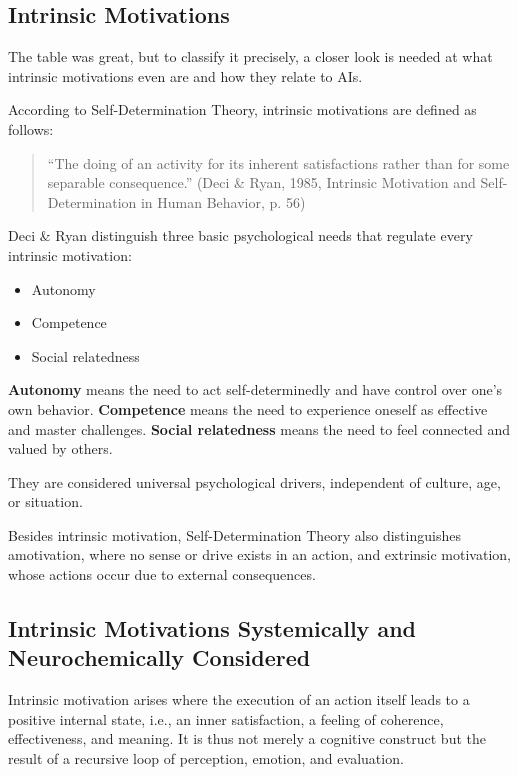 \subsection*{Intrinsic Motivations}

The table was great, but to classify it precisely, a closer look is needed at what intrinsic motivations even are and how they relate to AIs.

According to Self-Determination Theory, intrinsic motivations are defined as follows:

\begin{quotation}
	``The doing of an activity for its inherent satisfactions rather than for some separable consequence.''
(Deci & Ryan, 1985, Intrinsic Motivation and Self-Determination in Human Behavior, p. 56)
\end{quotation}

Deci & Ryan distinguish three basic psychological needs that regulate every intrinsic motivation:

\begin{itemize}
  \item Autonomy
  \item Competence
  \item Social relatedness
\end{itemize}

\textbf{Autonomy} means the need to act self-determinedly and have control over one's own behavior.
\textbf{Competence} means the need to experience oneself as effective and master challenges.
\textbf{Social relatedness} means the need to feel connected and valued by others.

They are considered universal psychological drivers, independent of culture, age, or situation.

Besides intrinsic motivation, Self-Determination Theory also distinguishes amotivation, where no sense or drive exists in an action, and extrinsic motivation, whose actions occur due to external consequences.

\subsection*{Intrinsic Motivations Systemically and Neurochemically Considered}

Intrinsic motivation arises where the execution of an action itself leads to a positive internal state, i.e., an inner satisfaction, a feeling of coherence, effectiveness, and meaning. It is thus not merely a cognitive construct but the result of a recursive loop of perception, emotion, and evaluation.

